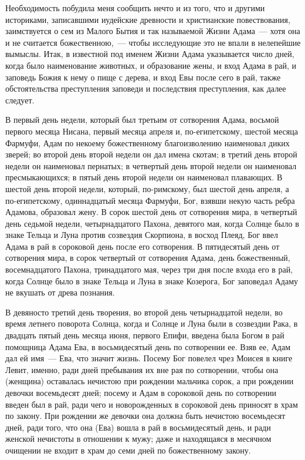 Необходимость побудила меня сообщить нечто и
из того, что и другими историками, записавшими
иудейские древности и христианские
повествования, заимствуется о сем из Малого
Бытия и так называемой Жизни Адама~--- хотя она и не
считается божественною,~--- чтобы исследующие это
не впали в нелепейшие вымыслы. Итак, в известной
под именем Жизни Адама указывается число дней,
когда было наименование животных, и образование
жены, и вход Адама в рай, и заповедь Божия к нему о
пище с дерева, и вход Евы после сего в рай, также
обстоятельства преступления заповеди и
последствия преступления, как далее следует.

В первый день недели, который был третьим от
сотворения Адама, восьмой первого месяца Нисана,
первый месяца апреля и, по-египетскому, шестой
месяца Фармуфи, Адам по некоему божественному
благоизволению наименовал диких зверей; во
второй день второй недели он дал имена скотам; в
третий день второй недели он наименовал
пернатых; в четвертый день второй недели он
наименовал пресмыкающихся; в пятый день второй
недели он наименовал плавающих. В шестой день
второй недели, который, по-римскому, был шестой
день апреля, а по-египетскому, одиннадцатый
месяца Фармуфи, Бог, взявши некую часть ребра
Адамова, образовал жену. В сорок шестой день от
сотворения мира, в четвертый день седьмой недели,
четырнадцатого Пахона, девятого мая, когда
Солнце было в знаке Тельца и Луна против
созвездия Скорпиона, в восход Плеяд, Бог ввел
Адама в рай в сороковой день после его
сотворения. В пятидесятый день от сотворения
мира, в сорок четвертый от сотворения Адама, день
божественный, восемнадцатого Пахона,
тринадцатого мая, через три дня после входа его в
рай, когда Солнце было в знаке Тельца и Луна в
знаке Козерога, Бог заповедал Адаму не вкушать от
древа познания.

В девяносто третий день творения, во второй
день четырнадцатой недели, во время летнего
поворота Солнца, когда и Солнце и Луна были в
созвездии Рака, в двадцать пятый день месяца
июня, первого Епифи, введена была Богом в рай
помощница Адама Ева, в восьмидесятый день по
сотворении ее. Взяв ее, Адам дал ей имя~--- Ева, что
значит жизнь. Посему Бог повелел чрез Моисея в
книге Левит, именно, ради дней пребывания их вне
рая по сотворении, чтобы она (женщина) оставалась
нечистою при рождении мальчика сорок, а при
рождении девочки восемьдесят дней; посему и Адам
в сороковой день по сотворении введен был в рай,
ради чего и новорожденных в сороковой день
приносят в храм по закону. При рождении же
девочки она должна быть нечистою восемьдесят
дней, ради того, что она (Ева) вошла в рай в
восьмидесятый день, и ради женской нечистоты в
отношении к мужу; даже и находящаяся в месячном
очищении не входит в храм до семи дней по
божественному закону.


